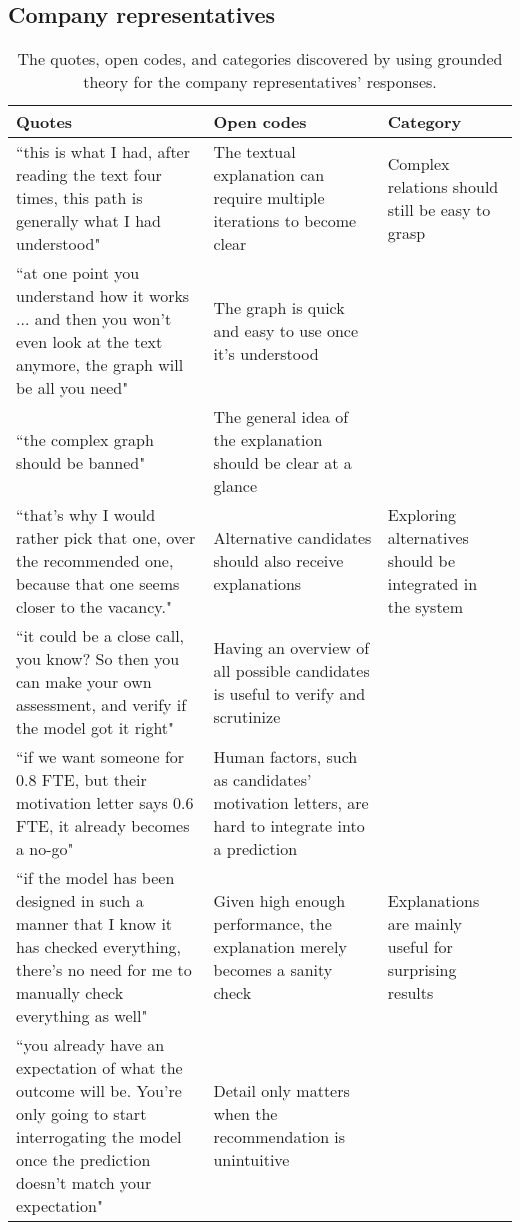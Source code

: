 \subsection{Company representatives}
\begin{table*}[]
\captionsetup{width=1.5\textwidth}
\caption{The quotes, open codes, and categories discovered by using grounded theory for the company representatives' responses.}
\footnotesize
\begin{adjustwidth}{-2.5in}{-2.5in}
\centering
\begin{tabularx}{1.5\textwidth}{@{}X>{\raggedright\arraybackslash}p{6.5cm}>{\raggedright\arraybackslash}p{3.5cm}@{}}

\toprule
\textbf{Quotes} &
  \textbf{Open codes} &
  \textbf{Category} \\ \midrule
``this is what I had, after reading the text four times, this path is generally what I had understood" &
  The textual explanation can require multiple iterations to become clear &
  Complex relations should still be easy to grasp \\ \cmidrule(r){1-1}
``at one point you understand how it works ... and then you won't even look at the text anymore, the graph will be all you need" &
  The graph is quick and easy to use once it's understood &
   \\ \cmidrule(r){1-1}
``the complex graph should be banned" &
  The general idea of the explanation should be clear at a glance &
   \\ \midrule
``that's why I would rather pick that one, over the recommended one, because that one seems closer to the vacancy." &
  Alternative candidates should also receive explanations &
  Exploring alternatives should be integrated in the system \\ \cmidrule(r){1-1}
``it could be a close call, you know? So then you can make your own assessment, and verify if the model got it right" &
  Having an overview of all possible candidates is useful to verify and scrutinize &
   \\ \cmidrule(r){1-1}
``if we want someone for 0.8 FTE, but their motivation letter says 0.6 FTE, it already becomes a no-go" &
  Human factors, such as candidates' motivation letters, are hard to integrate into a prediction &
   \\ \midrule
``if the model has been designed in such a manner that I know it has checked everything, there's no need for me to manually check everything as well" &
  Given high enough performance, the explanation merely becomes a sanity check &
  Explanations are mainly useful for surprising results \\ \cmidrule(r){1-1}
``you already have an expectation of what the outcome will be. You're only going to start interrogating the model once the prediction doesn't match your expectation" &
  Detail only matters when the recommendation is unintuitive &
   \\ \bottomrule
   
\end{tabularx}
\end{adjustwidth}
\label{tab:companies_GT}   
\end{table*}

